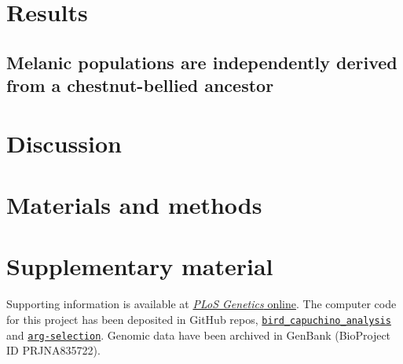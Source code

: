 \section{Results}

\subsection{Melanic populations are independently derived from a chestnut-bellied ancestor}

\section{Discussion}

\section{Materials and methods}

\section{Supplementary material}
Supporting information is available at \href{https://journals.plos.org/PLOSGENETICS/article?id=10.1371/journal.pgen.1010474#sec017}{\textit{PLoS Genetics} online}. The computer code for this project has been deposited in GitHub repos, \href{https://github.com/CshlSiepelLab/bird_capuchino_analysis}{\texttt{bird\_capuchino\_analysis}} and \href{https://github.com/CshlSiepelLab/arg-selection}{\texttt{arg-selection}}. Genomic data have been archived in GenBank (BioProject ID PRJNA835722).